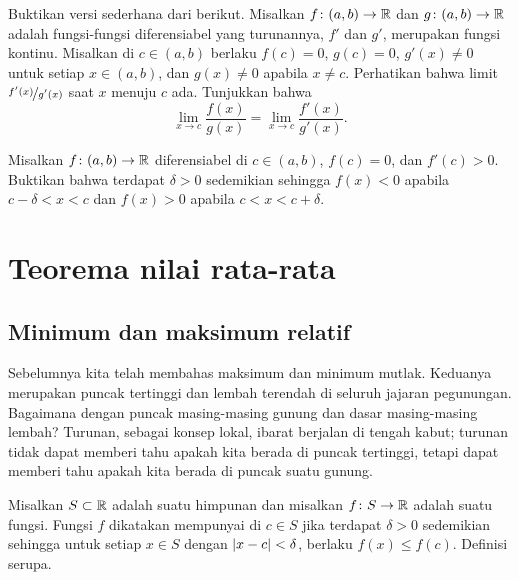 \begin{exercise} \label{exercise:simpleLHopital}
Buktikan versi sederhana dari  berikut.
Misalkan 
$f \colon (a,b) \to {\mathbb{R}}$ dan $g \colon (a,b) \to {\mathbb{R}}$ adalah fungsi-fungsi
diferensiabel
yang turunannya, $f'$ dan $g'$, merupakan fungsi kontinu.
Misalkan di $c \in (a,b)$ berlaku $f(c) = 0$, $g(c)=0$,
$g'(x) \neq 0$ untuk setiap $x \in (a,b)$, dan
$g(x) \neq 0$ apabila $x \neq c$.   Perhatikan
bahwa limit $\nicefrac{f'(x)}{g'(x)}$ saat $x$ menuju $c$ ada.  Tunjukkan bahwa
\begin{equation*}
\lim_{x \to c} \frac{f(x)}{g(x)} = 
\lim_{x \to c} \frac{f'(x)}{g'(x)} .
\end{equation*}
\end{exercise}

\begin{exercise}
Misalkan $f \colon (a,b) \to {\mathbb{R}}$ diferensiabel di $c \in (a,b)$,
$f(c)=0$, dan $f'(c) > 0$.
Buktikan bahwa terdapat $\delta > 0$ sedemikian sehingga $f(x) < 0$
apabila $c-\delta < x < c$ dan
$f(x) > 0$ 
apabila $c < x < c+\delta$.
\end{exercise}


\sectionnewpage
\section{Teorema nilai rata-rata}
\label{sec:mvt}



\subsection{Minimum dan maksimum relatif}

Sebelumnya kita telah membahas maksimum dan minimum mutlak.  Keduanya merupakan puncak tertinggi dan
lembah terendah di seluruh jajaran pegunungan.  Bagaimana dengan
puncak masing-masing gunung dan dasar masing-masing lembah?
Turunan, sebagai konsep lokal, ibarat berjalan di tengah kabut; turunan
tidak dapat memberi tahu apakah kita berada di puncak tertinggi, tetapi dapat memberi tahu apakah kita berada
di puncak suatu gunung.

\begin{defn}
Misalkan $S \subset {\mathbb{R}}$ adalah suatu himpunan dan
misalkan $f \colon S \to {\mathbb{R}}$ adalah suatu fungsi.  Fungsi $f$ dikatakan mempunyai
\emph{}
di $c \in S$ jika terdapat $\delta>0$
sedemikian sehingga untuk setiap $x \in S$ dengan $\lvert {x-c} \rvert < \delta$,
berlaku $f(x) \leq f(c)$.
Definisi
\emph{}
serupa.
\end{defn}

